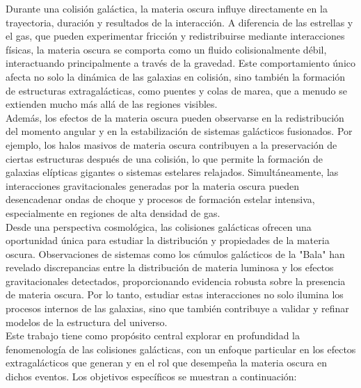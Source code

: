 \documentclass{article}
\begin{document}
Durante una colisión galáctica, la materia oscura influye directamente en la trayectoria, duración y resultados de la interacción. A diferencia de las estrellas y el gas, que pueden experimentar fricción y redistribuirse mediante interacciones físicas, la materia oscura se comporta como un fluido colisionalmente débil, interactuando principalmente a través de la gravedad. Este comportamiento único afecta no solo la dinámica de las galaxias en colisión, sino también la formación de estructuras extragalácticas, como puentes y colas de marea, que a menudo se extienden mucho más allá de las regiones visibles. \\

Además, los efectos de la materia oscura pueden observarse en la redistribución del momento angular y en la estabilización de sistemas galácticos fusionados. Por ejemplo, los halos masivos de materia oscura contribuyen a la preservación de ciertas estructuras después de una colisión, lo que permite la formación de galaxias elípticas gigantes o sistemas estelares relajados. Simultáneamente, las interacciones gravitacionales generadas por la materia oscura pueden desencadenar ondas de choque y procesos de formación estelar intensiva, especialmente en regiones de alta densidad de gas. \\

Desde una perspectiva cosmológica, las colisiones galácticas ofrecen una oportunidad única para estudiar la distribución y propiedades de la materia oscura. Observaciones de sistemas como los cúmulos galácticos de la "Bala" han revelado discrepancias entre la distribución de materia luminosa y los efectos gravitacionales detectados, proporcionando evidencia robusta sobre la presencia de materia oscura. Por lo tanto, estudiar estas interacciones no solo ilumina los procesos internos de las galaxias, sino que también contribuye a validar y refinar modelos de la estructura del universo. \\
Este trabajo tiene como propósito central explorar en profundidad la fenomenología de las colisiones galácticas, con un enfoque particular en los efectos extragalácticos que generan y en el rol que desempeña la materia oscura en dichos eventos. Los objetivos específicos se muestran a continuación: \\
\end{document}
